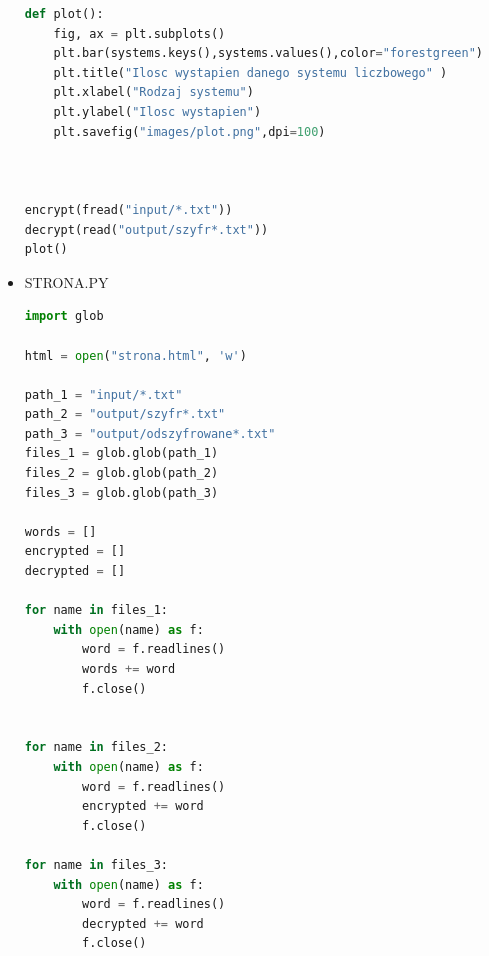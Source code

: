 \documentclass[12pt,a4paper]{article}
\begin{document}
\begin{itemize}
\begin{lstlisting}[language=Python]
def plot():
    fig, ax = plt.subplots()
    plt.bar(systems.keys(),systems.values(),color="forestgreen")
    plt.title("Ilosc wystapien danego systemu liczbowego" )
    plt.xlabel("Rodzaj systemu")
    plt.ylabel("Ilosc wystapien")
    plt.savefig("images/plot.png",dpi=100)



encrypt(fread("input/*.txt"))
decrypt(read("output/szyfr*.txt"))
plot()

	\end{lstlisting}
	
	\item STRONA.PY
	\begin{lstlisting}[language=Python]
import glob

html = open("strona.html", 'w')

path_1 = "input/*.txt"
path_2 = "output/szyfr*.txt"
path_3 = "output/odszyfrowane*.txt"
files_1 = glob.glob(path_1)
files_2 = glob.glob(path_2)
files_3 = glob.glob(path_3)

words = []
encrypted = []
decrypted = []

for name in files_1:
    with open(name) as f:
        word = f.readlines()
        words += word
        f.close()


for name in files_2:
    with open(name) as f:
        word = f.readlines()
        encrypted += word
        f.close()

for name in files_3:
    with open(name) as f:
        word = f.readlines()
        decrypted += word
        f.close()
        

\end{lstlisting}
\end{itemize}
\end{document}
